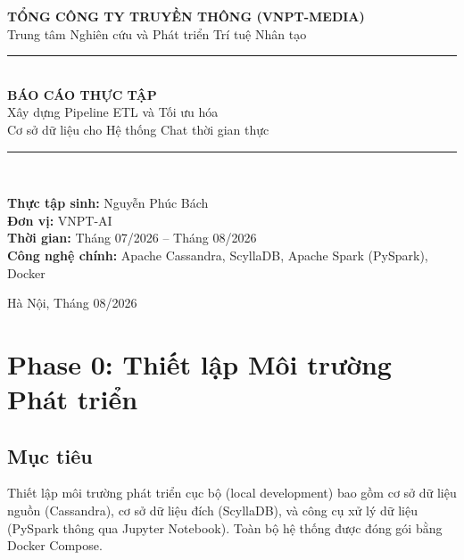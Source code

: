 \documentclass[12pt,a4paper]{article}
\begin{document}
\begin{titlepage}
    \centering
    \vspace*{1cm}

    {\Large\textbf{TỔNG CÔNG TY TRUYỀN THÔNG (VNPT-MEDIA)}}\\[0.3cm]
    {\large Trung tâm Nghiên cứu và Phát triển Trí tuệ Nhân tạo}\\[2cm]

    \rule{\textwidth}{1pt}\\[0.5cm]
    {\LARGE\textbf{BÁO CÁO THỰC TẬP}}\\[0.3cm]
    {\Large Xây dựng Pipeline ETL và Tối ưu hóa\\
    Cơ sở dữ liệu cho Hệ thống Chat thời gian thực}\\[0.5cm]
    \rule{\textwidth}{1pt}\\[2cm]

    \begin{flushleft}
        \large
        \textbf{Thực tập sinh:} Nguyễn Phúc Bách \\[0.3cm]
        \textbf{Đơn vị:} VNPT-AI \\[0.3cm]
        \textbf{Thời gian:} Tháng 07/2026 -- Tháng 08/2026 \\[0.3cm]
        \textbf{Công nghệ chính:} Apache Cassandra, ScyllaDB, Apache Spark (PySpark), Docker
    \end{flushleft}

    \vfill
    {\large Hà Nội, Tháng 08/2026}
\end{titlepage}

\tableofcontents
\newpage

\section{Phase 0: Thiết lập Môi trường Phát triển}
\label{sec:phase0}

\subsection{Mục tiêu}
Thiết lập môi trường phát triển cục bộ (local development) bao gồm cơ sở dữ liệu nguồn (Cassandra), cơ sở dữ liệu đích (ScyllaDB), và công cụ xử lý dữ liệu (PySpark thông qua Jupyter Notebook). Toàn bộ hệ thống được đóng gói bằng Docker Compose.
\end{document}
